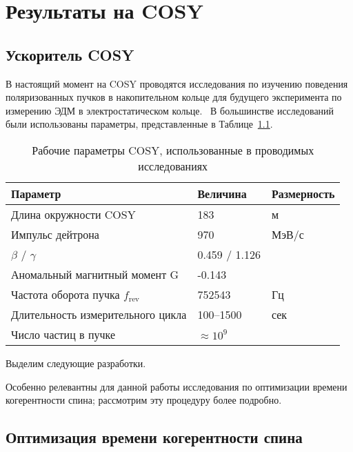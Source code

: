 \chapter{Результаты на COSY}\label{chpt4:top-level}

\section{Ускоритель COSY}


В настоящий момент на COSY проводятся исследования по изучению поведения поляризованных пучков в накопительном кольце для будущего эксперимента по измерению ЭДМ в электростатическом кольце.~\cite{Lehrach:Precursor2012, Lehrach:IPAC15, COSY:SpinTuneMapping, Eversmann:SpinTuneMeasurement, COSY:SCT:1000sec, Wagner:BBA2018}
В большинстве исследований были использованы параметры, представленные в Таблице~\ref{tbl:COSY-studies}.

\begin{table}[h]\centering
	\caption{Рабочие параметры COSY, использованные в проводимых исследованиях\label{tbl:COSY-studies}}
	\begin{tabular}{lll}
		\toprule
		Параметр & Величина & Размерность \\
		\midrule
		Длина окружности COSY& 183 & м\\
		Импульс дейтрона & 970 & МэВ/с \\
		 $\beta$ / $\gamma$ & 0.459 / 1.126 & \\
		 Аномальный магнитный момент G& -0.143& \\
		 Частота оборота пучка $f_{\mathrm{rev}}$& 752543& Гц\\
		 Длительность измерительного цикла& 100--1500& сек\\
		 Число частиц в пучке & $\approx 10^9$& \\
		 \bottomrule
	\end{tabular}
\end{table}

Выделим следующие разработки.


Особенно релевантны для данной работы исследования по оптимизации времени когерентности спина; рассмотрим эту процедуру более подробно.
\section{Оптимизация времени когерентности спина}\label{sec:COSY:SCT-optimization}



\clearpage
